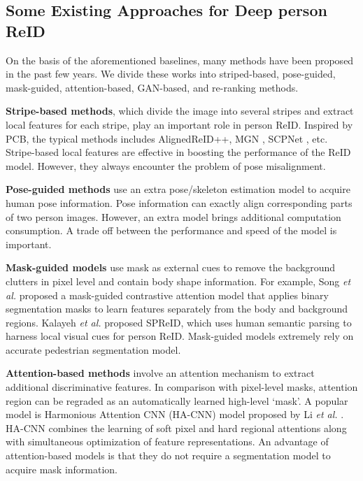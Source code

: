 \documentclass[journal]{IEEEtran}
\begin{document}
\subsection{Some Existing Approaches for Deep person ReID}
On the basis of the aforementioned baselines, many methods have been proposed in the past few years. We divide these works into striped-based, pose-guided, mask-guided, attention-based, GAN-based, and re-ranking methods.

\textbf{Stripe-based methods}, which divide the image into several stripes and extract local features for each stripe, play an important role in person ReID.
Inspired by PCB, the typical methods includes AlignedReID++\cite{LUO2019}, MGN \cite{wang2018learning}, SCPNet \cite{fan2018scpnet}, etc.
Stripe-based local features are effective in boosting the performance of the ReID model. However, they always encounter the problem of pose misalignment.


\textbf{Pose-guided methods} \cite{zhao2017spindle, wei2017glad, Sarfraz_2018_CVPR, zheng2019pose} use an extra pose/skeleton estimation model to acquire human pose information.
Pose information can exactly align corresponding parts of two person images. However, an extra model brings additional computation consumption. A trade off between the performance and speed of the model is important.

\textbf{Mask-guided models} \cite{song2018mask,kalayeh2018human,qi2018maskreid} use mask as external cues to remove the background clutters in pixel level and contain body shape information.
For example, Song \emph{et al.} \cite{song2018mask} proposed a mask-guided contrastive attention model that applies binary segmentation masks to learn features separately from the body and background regions.
Kalayeh \emph{et al.} \cite{kalayeh2018human} proposed SPReID, which uses human semantic parsing to harness local visual cues for person ReID. Mask-guided models extremely rely on accurate pedestrian segmentation model.

\textbf{Attention-based methods} \cite{si2018dual,li2018harmonious,li2018diversity,xu2018attention} involve an attention mechanism to extract additional discriminative features. In comparison with pixel-level masks, attention region can be regraded as an automatically learned high-level `mask'.
A popular model is Harmonious Attention CNN (HA-CNN) model proposed by Li \emph{et al.} \cite{li2018harmonious}.
HA-CNN combines the learning of soft pixel and hard regional attentions along with simultaneous optimization of feature representations.
An advantage of attention-based models is that they do not require a segmentation model to acquire mask information.
\end{document}
